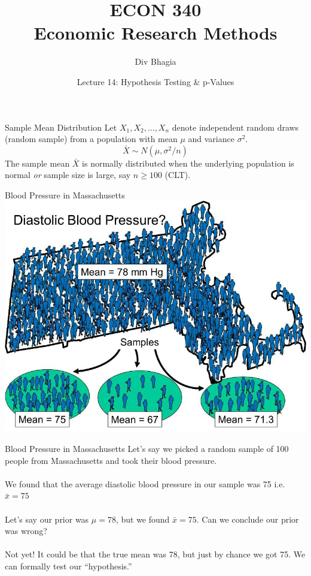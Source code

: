 \documentclass{./../div_teaching_slides}
\begin{document}
\title{ECON 340 \\ Economic Research Methods}
\author{Div Bhagia}
\date{Lecture 14: Hypothesis Testing \& p-Values}

\begin{frame}
\maketitle
\end{frame}


\begin{frame}{Sample Mean Distribution}
Let $X_1, X_2,..., X_n$ denote independent random draws (random sample) from a population with mean $\mu$ and variance $\sigma^2$. 
$$ \bar{X} \sim N(\mu, \sigma^2/n)  $$
The sample mean  $\bar{X}$ is normally distributed when the underlying population is normal \textit{or} sample size is large, say $n \geq 100$ (CLT).
\end{frame}

\begin{frame}{Blood Pressure in Massachusetts}
\centering
\includegraphics[scale=0.35]{Sampling3.jpg}
\end{frame}

\begin{frame}{Blood Pressure in Massachusetts}
Let's say we picked a random sample of 100 people from Massachusetts and took their blood pressure. \\~\\
We found that the average diastolic blood pressure in our sample was 75 i.e. $\bar{x} = 75$ \\~\\
Let's say our prior was $\mu=78$, but we found $\bar{x}=75$. Can we conclude our prior was wrong? \\~\\
\pause	Not yet! It could be that the true mean was 78, but just by chance we got 75.  We can formally test our ``hypothesis.''
\end{frame}
\end{document}
